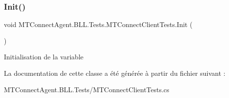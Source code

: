 \subsubsection{\texorpdfstring{Init()}{Init()}}
{\footnotesize\ttfamily void M\+T\+Connect\+Agent.\+B\+L\+L.\+Tests.\+M\+T\+Connect\+Client\+Tests.\+Init (\begin{DoxyParamCaption}{ }\end{DoxyParamCaption})\hspace{0.3cm}{\ttfamily [inline]}}



Initialisation de la variable 



La documentation de cette classe a été générée à partir du fichier suivant \+:\begin{DoxyCompactItemize}
\item 
M\+T\+Connect\+Agent.\+B\+L\+L.\+Tests/M\+T\+Connect\+Client\+Tests.\+cs\end{DoxyCompactItemize}
